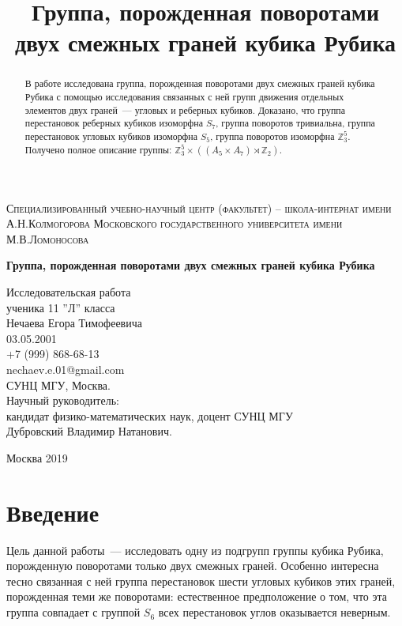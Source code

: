 \documentclass[utf8,a4paper,12pt]{article}
\title{Группа, порожденная поворотами двух смежных граней кубика Рубика}
\author{}
\date{}
\begin{document}
\begin{center}
{\scshape Специализированный учебно-научный центр (факультет) – школа-интернат имени А.Н.Колмогорова Московского государственного университета имени М.В.Ломоносова\par}
\par\vfill
\vspace{1.5cm}
{\Large\bfseries
Группа, порожденная поворотами двух смежных граней кубика Рубика
\par}
\vspace{1.5cm}
\par\vfill
\noindent\hspace{0.52\textwidth}\parbox[t]{0.48\textwidth}{
Исследовательская работа\\[3pt]
ученика 11 ''Л'' класса\\[3pt]
Нечаева Егора Тимофеевича\\[3pt]
03.05.2001\\[3pt]
+7 (999) 868-68-13\\[3pt]
nechaev.e.01@gmail.com\\[3pt]
СУНЦ МГУ, Москва.\\[3pt]
Научный руководитель:\\[3pt]
кандидат физико-математических наук, доцент СУНЦ МГУ\\
Дубровский Владимир Натанович.\\[2ex]
}
\par\vfill
Москва 2019
\end{center}
\thispagestyle{empty}
\pagebreak

\begin{abstract}
В работе исследована группа, порожденная поворотами двух смежных граней кубика Рубика с помощью исследования связанных с ней групп движения отдельных элементов двух граней~--- угловых и реберных кубиков. Доказано, что группа перестановок реберных кубиков изоморфна $S_7$, группа поворотов тривиальна, группа перестановок угловых кубиков изоморфна $S_5$, группа поворотов изоморфна $\mathbb{Z}_3^5$. Получено полное описание группы: $\mathbb{Z}_3^5\times ((A_5\times A_7)\rtimes\mathbb{Z}_2)$.
\end{abstract}
\section{Введение}
Цель данной работы~--- исследовать одну из подгрупп группы кубика Рубика, порожденную поворотами только двух смежных граней. Особенно интересна тесно связанная с ней группа перестановок шести угловых кубиков этих граней, порожденная теми же поворотами: естественное предположение о том, что эта группа совпадает с группой $S_6$ всех перестановок углов оказывается неверным.
\end{document}
